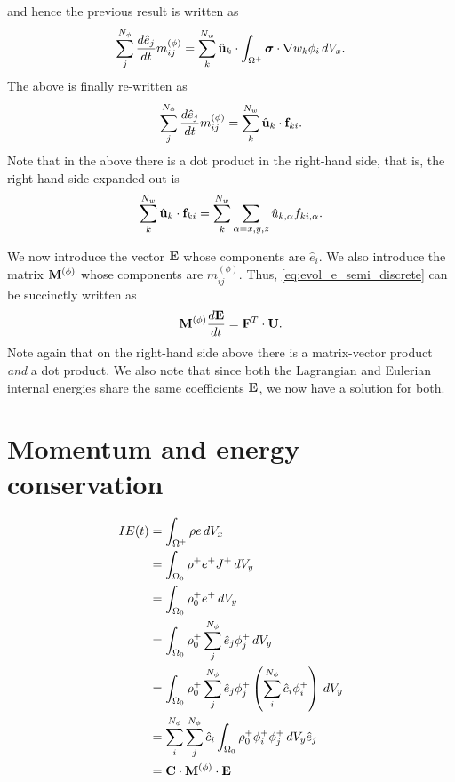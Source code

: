 \documentclass[11pt]{article}
\begin{document}
and hence the previous result is written as
\begin{equation}
    \sum_j^{N_\phi} \frac{d \hat{e}_j}{dt} m_{ij}^{(\phi)} = \sum_k^{N_w} \hat{\mathbf{u}}_k \cdot \int_{\Omega^+} \bm \sigma \cdot \nabla w_k \phi_i \, dV_x.
\end{equation}
The above is finally re-written as
\begin{equation}
    \label{eq:evol_e_semi_discrete}
    \sum_j^{N_\phi} \frac{d \hat{e}_j}{d t} m^{(\phi)}_{ij} = \sum_k^{N_w} \hat{\mathbf{u}}_k \cdot \mathbf{f}_{ki}.
\end{equation}
Note that in the above there is a dot product in the right-hand side, that is, the right-hand side expanded out is  
\begin{equation}
    \sum_k^{N_w} \hat{\mathbf{u}}_k \cdot \mathbf{f}_{ki} = \sum_k^{N_w} \sum_{\alpha=x,y,z} \hat{u}_{k,\alpha} f_{ki,\alpha}.
\end{equation}

We now introduce the vector $\mathbf{E}$ whose components are $\hat{e}_i$. We also introduce the matrix $\mathbf{M}^{(\phi)}$ whose components are $m_{ij}^{(\phi)}$. Thus, \cref{eq:evol_e_semi_discrete} can be succinctly written as
\begin{equation}
    \mathbf{M}^{(\phi)} \frac{d\mathbf{E}}{dt} = \mathbf{F}^T \cdot \mathbf{U}.
\end{equation}
Note again that on the right-hand side above there is a matrix-vector product \textit{and} a dot product. We also note that since both the Lagrangian and Eulerian internal energies share the same coefficients $\mathbf{E}$, we now have a solution for both.

\section{Momentum and energy conservation}

\begin{align}
    IE(t) &= \int_{\Omega^+} \rho e \, dV_x \nonumber \\
    &= \int_{\Omega_0} \rho^+ e^+ J^+ \, dV_y \nonumber \\
    &= \int_{\Omega_0} \rho^+_0 e^+ \, dV_y \nonumber \\
    &= \int_{\Omega_0} \rho_0^+ \sum_{j}^{N_\phi} \hat{e}_j \phi_j^+ \, dV_y \nonumber \\
    &= \int_{\Omega_0} \rho_0^+ \sum_{j}^{N_\phi} \hat{e}_j \phi_j^+ \left ( \sum_{i}^{N_\phi} \hat{c}_i \phi^+_i \right ) \, dV_y \nonumber \\
    &= \sum_i^{N_\phi} \sum_j^{N_\phi} \hat{c}_i \int_{\Omega_0} \rho_0^+ \phi_i^+ \phi_j^+ \, dV_y \hat{e}_j \nonumber \\
    &= \mathbf{C} \cdot \mathbf{M}^{(\phi)} \cdot \mathbf{E} 
\end{align}
\end{document}
